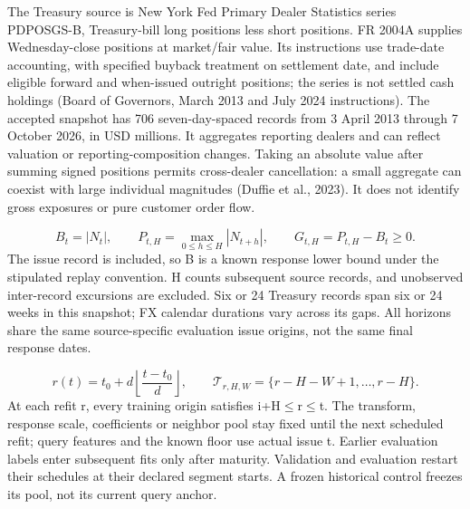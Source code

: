 \documentclass[10pt,a4paper]{article}
\begin{document}
The Treasury source is New York Fed Primary Dealer Statistics series PDPOSGS-B, Treasury-bill long positions less short positions. FR 2004A supplies Wednesday-close positions at market/fair value. Its instructions use trade-date accounting, with specified buyback treatment on settlement date, and include eligible forward and when-issued outright positions; the series is not settled cash holdings (Board of Governors, March 2013 and July 2024 instructions). The accepted snapshot has 706 seven-day-spaced records from 3 April 2013 through 7 October 2026, in USD millions. It aggregates reporting dealers and can reflect valuation or reporting-composition changes. Taking an absolute value after summing signed positions permits cross-dealer cancellation: a small aggregate can coexist with large individual magnitudes (Duffie et al., 2023). It does not identify gross exposures or pure customer order flow.

\[
B_t=|N_t|,\qquad P_{t,H}=\max_{0\le h\le H}|N_{t+h}|,\qquad G_{t,H}=P_{t,H}-B_t\ge0.
\]
The issue record is included, so B is a known response lower bound under the stipulated replay convention. H counts subsequent source records, and unobserved inter-record excursions are excluded. Six or 24 Treasury records span six or 24 weeks in this snapshot; FX calendar durations vary across its gaps. All horizons share the same source-specific evaluation issue origins, not the same final response dates.

\[
r(t)=t_0+d\left\lfloor\frac{t-t_0}{d}\right\rfloor,\qquad\mathcal T_{r,H,W}=\{r-H-W+1,\ldots,r-H\}.
\]
At each refit r, every training origin satisfies i+H\(\le\)r\(\le\)t. The transform, response scale, coefficients or neighbor pool stay fixed until the next scheduled refit; query features and the known floor use actual issue t. Earlier evaluation labels enter subsequent fits only after maturity. Validation and evaluation restart their schedules at their declared segment starts. A frozen historical control freezes its pool, not its current query anchor.
\end{document}
